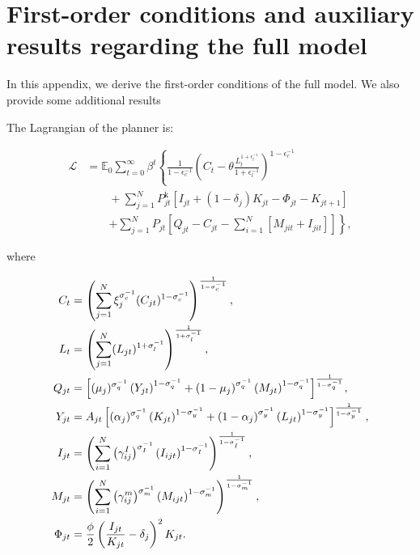\section{First-order conditions and auxiliary results regarding the full model\label{sec:Algebraic-Appendix}}

In this appendix, we derive the first-order conditions of the full model. We also provide some additional results

The Lagrangian of the planner is:

\begin{align*}
\mathcal{{L}} & =\mathbb{{E}}_{0}\sum_{t=0}^{\infty}\beta^{t}\left\{ \frac{1}{1-\epsilon_{c}^{-1}}\left(C_{t}-\theta\frac{L_{t}^{1+\epsilon_{l}^{-1}}}{1+\epsilon_{l}^{-1}}\right)^{1-\epsilon_{c}^{-1}}\right.\\
 & \qquad+\sum_{j=1}^{N}P_{jt}^{\text{k}}\left[I_{jt}+(1-\delta_{j})K_{jt}-\Phi_{jt}-K_{jt+1}\right]\\
 & \qquad\left.+\sum_{j=1}^{N}P_{jt}\left[Q_{jt}-C_{jt}-\sum_{i=1}^{N}\left[M_{jit}+I_{jit}\right]\right]\right\}, 
\end{align*}

where

\begin{align*}
C_{t} & =\left(\sum_{j=1}^{N}\xi_{j}^{\sigma_{c}^{-1}}(C_{jt})^{1-\sigma_{c}^{-1}}\right)^{\frac{1}{1-\sigma_{c}^{-1}}},\\
L_{t} & =\left(\sum_{j=1}^{N}(L_{jt})^{1+\sigma_{l}^{-1}}\right)^{\frac{1}{1+\sigma_{l}^{-1}}},\\
Q_{jt} & =\text{\ensuremath{\left[(\mu_{j})^{\sigma_{q}^{-1}}\left(Y_{jt}\right)^{1-\sigma_{q}^{-1}}+\left(1-\mu_{j}\right)^{\sigma_{q}^{-1}}\left(M_{jt}\right)^{1-\sigma_{q}^{-1}}\right]^{\frac{1}{1-\sigma_{q}^{-1}}}}},\\
Y_{jt} & =A_{jt}\left[(\alpha_{j})^{\sigma_{q}^{-1}}\left(K_{jt}\right)^{1-\sigma_{y}^{-1}}+\left(1-\alpha_{j}\right)^{\sigma_{y}^{-1}}\left(L_{jt}\right)^{1-\sigma_{y}^{-1}}\right]^{\frac{1}{1-\sigma_{y}^{-1}}},\\
I_{jt} & =\left(\sum_{i=1}^{N}\left(\gamma_{ij}^{I}\right)^{\sigma_{I}^{-1}}\left(I_{ijt}\right)^{1-\sigma_{I}^{-1}}\right)^{\frac{1}{1-\sigma_{I}^{-1}}},\\
M_{jt} & =\left(\sum_{i=1}^{N}\left(\gamma_{ij}^{m}\right)^{\sigma_{m}^{-1}}\left(M_{ijt}\right)^{1-\sigma_{m}^{-1}}\right)^{\frac{1}{1-\sigma_{m}^{-1}}},\\
\Phi_{jt} & =\frac{\phi}{2}\left(\frac{{I_{jt}}}{K_{jt}}-\delta_{j}\right)^{2}K_{jt}.
\end{align*}

